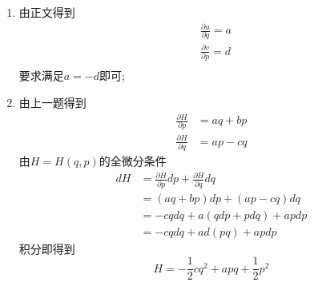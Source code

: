 \begin{solution}
    \begin{enumerate}[label=(\arabic*)]
        \item 由正文得到
        \begin{align*}
            &\frac{\partial u}{\partial q}=a\\
            &\frac{\partial v}{\partial p}=d\\
        \end{align*}
        要求满足$a=-d$即可;
        \item 由上一题得到
        \begin{align*}
            \frac{\partial H}{\partial p}&=aq+bp\\
            \frac{\partial H}{\partial q}&=ap-cq
        \end{align*}
        由$H=H(q,p)$的全微分条件
        \begin{align*}
            dH&=\frac{\partial H}{\partial p}dp+\frac{\partial H}{\partial q}dq\\
              &=(aq+bp)dp+(ap-cq)dq\\
              &=-cqdq+a(qdp+pdq)+apdp\\
              &=-cqdq+ad(pq)+apdp
        \end{align*}
        积分即得到
        $$H=-\frac12 cq^2+apq+\frac12 p^2$$
    \end{enumerate}
\end{solution}
